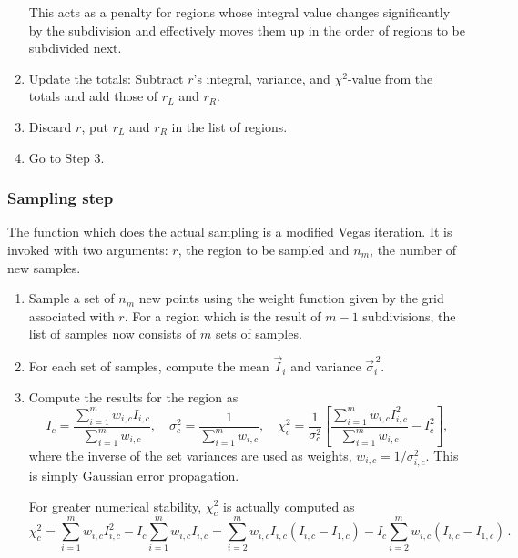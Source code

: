 \documentclass[12pt]{article}
\newcommand\cvec[1]{\vec #1}
\begin{document}
\begin{enumerate}
This acts as a penalty for regions whose integral value changes
significantly by the subdivision and effectively moves them up in the
order of regions to be subdivided next.

\item
Update the totals: Subtract $r$'s integral, variance, and $\chi^2$-value
from the totals and add those of $r_L$ and $r_R$.

\item
Discard $r$, put $r_L$ and $r_R$ in the list of regions.

\item
Go to Step 3.
\end{enumerate}


\subsubsection{Sampling step}

The function which does the actual sampling is a modified Vegas
iteration.  It is invoked with two arguments: $r$, the region to be
sampled and $n_m$, the number of new samples.

\begin{enumerate}
\item
Sample a set of $n_m$ new points using the weight function given by the
grid associated with $r$.  For a region which is the result of $m - 1$
subdivisions, the list of samples now consists of $m$ sets of samples.

\item
For each set of samples, compute the mean $\cvec I_i$ and variance
$\cvec\sigma_i^{\,2}$.

\item
Compute the results for the region as
$$
I_c = \frac{\sum_{i = 1}^m w_{i,c} I_{i,c}}{\sum_{i = 1}^m w_{i,c}},
\quad
\sigma_c^2 = \frac 1{\sum_{i = 1}^m w_{i,c}},
\quad
\chi_c^2 = \frac 1{\sigma_c^2}\left[
  \frac{\sum_{i = 1}^m w_{i,c} I_{i,c}^2}{\sum_{i = 1}^m w_{i,c}} -
  I_c^2\right],
$$
where the inverse of the set variances are used as weights, $w_{i,c} =
1/\sigma_{i,c}^2$.  This is simply Gaussian error propagation.

For greater numerical stability, $\chi_c^2$ is actually computed as
$$
\chi_c^2
= \sum_{i = 1}^m w_{i,c} I_{i,c}^2 -
  I_c \sum_{i = 1}^m w_{i,c} I_{i,c}
= \sum_{i = 2}^m w_{i,c} I_{i,c} (I_{i,c} - I_{1,c}) -
  I_c \sum_{i = 2}^m w_{i,c} (I_{i,c} - I_{1,c})\,.
$$
\end{enumerate}

\end{document}
